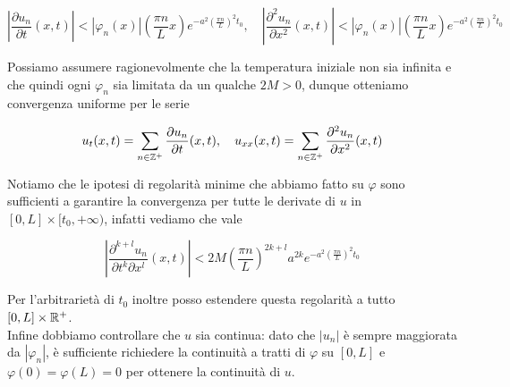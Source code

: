 \documentclass{article}
\begin{document}
\[ \left|\frac{\partial u_n}{\partial t}(x,t)  \right| < |\varphi_n(x)| \left( \frac{\pi n}{L}x \right) e^{- a^2 \left( \frac{\pi n}{L}\right)^2 t_0 }, \quad \left|\frac{\partial^2 u_n}{\partial x^2}(x,t)  \right| < |\varphi_n(x)| \left( \frac{\pi n}{L}x \right) e^{- a^2 \left( \frac{\pi n}{L}\right)^2 t_0 } \]

Possiamo assumere ragionevolmente che la temperatura iniziale non sia infinita e che quindi ogni $\varphi_n$ sia limitata da un qualche $2M > 0$, dunque otteniamo convergenza uniforme per le serie 

\[ u_t(x,t) = \sum_{n\in \mathbb{Z}^+} \frac{\partial u_n}{\partial t}(x,t), \quad u_{xx}(x,t) = \sum_{n\in \mathbb{Z}^+} \frac{\partial^2 u_n}{\partial x^2}(x,t) \]

Notiamo che le ipotesi di regolarità minime che abbiamo fatto su $\varphi$ sono sufficienti a garantire la convergenza per tutte le derivate di $u$ in $[0,L]\times [t_0, +\infty)$, infatti vediamo che vale

\[ \left| \frac{\partial^{k+l}u_n}{\partial t^k \partial x^l}(x,t) \right| < 2M \left(\frac{\pi n}{L}\right)^{2k+l} a^{2k} e^{- a^2 \left( \frac{\pi n}{L}\right)^2 t_0 } \]

Per l'arbitrarietà di $t_0$ inoltre posso estendere questa regolarità a tutto $[0,L]\times \mathbb{R}^+$.\\
Infine dobbiamo controllare che $u$ sia continua: dato che $|u_n|$ è sempre maggiorata da $|\varphi_n|$, è sufficiente richiedere la continuità a tratti di $\varphi$ su $[0,L]$ e $\varphi(0)=\varphi(L) = 0$ per ottenere la continuità di $u$.
\end{document}
